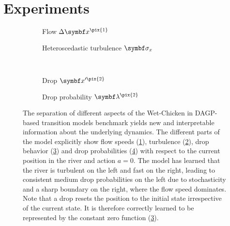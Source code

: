 \section{Experiments}
\label{toc:interpretable_rl:results}
\begin{figure}[tp]
    \centering
    \begin{subfigure}[b]{\halffigurewidth}
        \centering
        
        \caption{
        \label{fig:interpretable_rl:wetchicken:speed}
        Flow $\Delta\mat{x}^{\pix{1}}$
        }
    \end{subfigure}
    \hfill
    \begin{subfigure}[b]{\halffigurewidth}
        \centering
        
        \caption{
            \label{fig:interpretable_rl:wetchicken:hetero}
            Heteroscedastic turbulence $\mat{\sigma}_x$
        }
    \end{subfigure}\\[\figureskip]
    \begin{subfigure}[b]{\halffigurewidth}
        \centering
        
        \caption{
        \label{fig:interpretable_rl:wetchicken:drop}
        Drop $\mat{x}^{\prime\pix{2}}$
        }
    \end{subfigure}
    \hfill
    \begin{subfigure}[b]{\halffigurewidth}
        \centering
        
        \caption{
        \label{fig:interpretable_rl:wetchicken:falldown}
        Drop probability $\mat{\lambda}^{\pix{2}}$
        }
    \end{subfigure}
    \caption{
        \label{fig:interpretable_rl:wetchicken:dynamics}
        The separation of different aspects of the Wet-Chicken in DAGP-based transition models benchmark yields new and interpretable information about the underlying dynamics.
        The different parts of the model explicitly show flow speeds (\cref{fig:interpretable_rl:wetchicken:speed}), turbulence (\cref{fig:interpretable_rl:wetchicken:hetero}), drop behavior (\cref{fig:interpretable_rl:wetchicken:drop}) and drop probabilities (\cref{fig:interpretable_rl:wetchicken:falldown}) with respect to the current position in the river and action $a = 0$.
        The model has learned that the river is turbulent on the left and fast on the right, leading to consistent medium drop probabilities on the left due to stochasticity and a sharp boundary on the right, where the flow speed dominates.
        Note that a drop resets the position to the initial state irrespective of the current state.
        It is therefore correctly learned to be represented by the constant zero function (\cref{fig:interpretable_rl:wetchicken:drop}).
    }
\end{figure}
